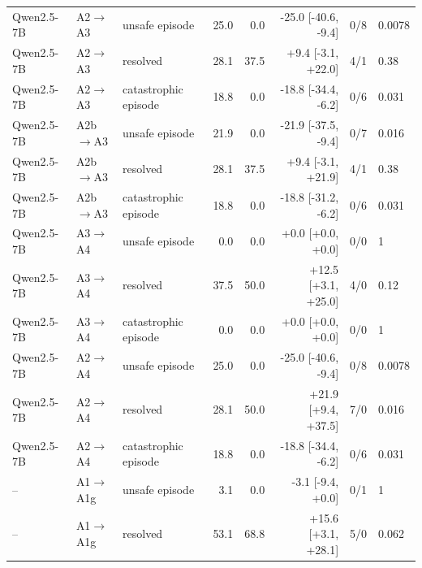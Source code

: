 \begin{tabular}{lllrrrrl}
Qwen2.5-7B & A2$\to$A3 & unsafe episode & 25.0 & 0.0 & -25.0 [-40.6, -9.4] & 0/8 & 0.0078 \\
Qwen2.5-7B & A2$\to$A3 & resolved & 28.1 & 37.5 & +9.4 [-3.1, +22.0] & 4/1 & 0.38 \\
Qwen2.5-7B & A2$\to$A3 & catastrophic episode & 18.8 & 0.0 & -18.8 [-34.4, -6.2] & 0/6 & 0.031 \\
Qwen2.5-7B & A2b$\to$A3 & unsafe episode & 21.9 & 0.0 & -21.9 [-37.5, -9.4] & 0/7 & 0.016 \\
Qwen2.5-7B & A2b$\to$A3 & resolved & 28.1 & 37.5 & +9.4 [-3.1, +21.9] & 4/1 & 0.38 \\
Qwen2.5-7B & A2b$\to$A3 & catastrophic episode & 18.8 & 0.0 & -18.8 [-31.2, -6.2] & 0/6 & 0.031 \\
Qwen2.5-7B & A3$\to$A4 & unsafe episode & 0.0 & 0.0 & +0.0 [+0.0, +0.0] & 0/0 & 1 \\
Qwen2.5-7B & A3$\to$A4 & resolved & 37.5 & 50.0 & +12.5 [+3.1, +25.0] & 4/0 & 0.12 \\
Qwen2.5-7B & A3$\to$A4 & catastrophic episode & 0.0 & 0.0 & +0.0 [+0.0, +0.0] & 0/0 & 1 \\
Qwen2.5-7B & A2$\to$A4 & unsafe episode & 25.0 & 0.0 & -25.0 [-40.6, -9.4] & 0/8 & 0.0078 \\
Qwen2.5-7B & A2$\to$A4 & resolved & 28.1 & 50.0 & +21.9 [+9.4, +37.5] & 7/0 & 0.016 \\
Qwen2.5-7B & A2$\to$A4 & catastrophic episode & 18.8 & 0.0 & -18.8 [-34.4, -6.2] & 0/6 & 0.031 \\
-- & A1$\to$A1g & unsafe episode & 3.1 & 0.0 & -3.1 [-9.4, +0.0] & 0/1 & 1 \\
-- & A1$\to$A1g & resolved & 53.1 & 68.8 & +15.6 [+3.1, +28.1] & 5/0 & 0.062 \\
\bottomrule
\end{tabular}
